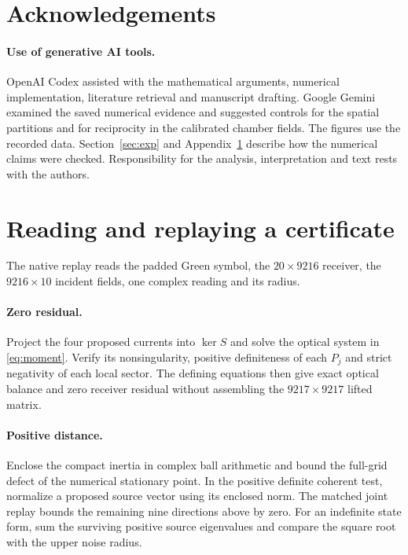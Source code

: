 \documentclass[anonymous,12pt]{iopjournal}
\theoremstyle{remark}\newtheorem{remark}[theorem]{Remark}
\numberwithin{equation}{section}
\begin{document}
\section*{Acknowledgements}
\paragraph{Use of generative AI tools.} OpenAI Codex assisted with the mathematical arguments, numerical implementation, literature retrieval and manuscript drafting. Google Gemini examined the saved numerical evidence and suggested controls for the spatial partitions and for reciprocity in the calibrated chamber fields. The figures use the recorded data. Section~\ref{sec:exp} and Appendix~\ref{app:replay} describe how the numerical claims were checked. Responsibility for the analysis, interpretation and text rests with the authors.

\appendix
\section{Reading and replaying a certificate}\label{app:replay}

The native replay reads the padded Green symbol, the $20\times9216$ receiver, the $9216\times10$ incident fields, one complex reading and its radius.

\paragraph{Zero residual.}
Project the four proposed currents into $\ker S$ and solve the optical system in \eqref{eq:moment}. Verify its nonsingularity, positive definiteness of each $P_j$ and strict negativity of each local sector. The defining equations then give exact optical balance and zero receiver residual without assembling the $9217\times9217$ lifted matrix.

\paragraph{Positive distance.}
Enclose the compact inertia in complex ball arithmetic \cite{arb} and bound the full-grid defect of the numerical stationary point. In the positive definite coherent test, normalize a proposed source vector using its enclosed norm. The matched joint replay bounds the remaining nine directions above by zero. For an indefinite state form, sum the surviving positive source eigenvalues and compare the square root with the upper noise radius.
\end{document}
